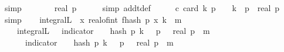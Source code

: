 \begin{isabellebody}
\ simp\isanewline
\ \ \isamarkupfalse%
\ \isamarkupfalse%
\ {\isachardoublequoteopen}{\isachardot}{\kern0pt}{\isachardot}{\kern0pt}{\isachardot}{\kern0pt}\ {\isacharequal}{\kern0pt}\ {\isacharparenleft}{\kern0pt}real\ p{\isacharminus}{\kern0pt}{}{\isacharparenright}{\kern0pt}{\isacharslash}{\kern0pt}{}{\isachardoublequoteclose}\isanewline
\ \ \ \ \isamarkupfalse%
\ {\isacharparenleft}{\kern0pt}simp\ add{\isacharcolon}{\kern0pt}t{\isacharunderscore}{\kern0pt}def{\isacharparenright}{\kern0pt}\isanewline
\ \ \isamarkupfalse%
\ \isamarkupfalse%
\ c{\isacharunderscore}{\kern0pt}{}{\isacharcolon}{\kern0pt}\ {\isachardoublequoteopen}card\ {\isacharparenleft}{\kern0pt}{\isacharbraceleft}{\kern0pt}k{\isachardot}{\kern0pt}\ p\ {\isasymle}\ {}\ {\isacharasterisk}{\kern0pt}\ k{\isacharbraceright}{\kern0pt}\ {\isasyminter}\ {\isacharbraceleft}{\kern0pt}{}{\isachardot}{\kern0pt}{\isachardot}{\kern0pt}{\isacharless}{\kern0pt}p{\isacharbraceright}{\kern0pt}{\isacharparenright}{\kern0pt}\ {\isacharequal}{\kern0pt}\ {\isacharparenleft}{\kern0pt}real\ p{\isacharminus}{\kern0pt}{}{\isacharparenright}{\kern0pt}{\isacharslash}{\kern0pt}{}{\isachardoublequoteclose}\ \isamarkupfalse%
\ simp\isanewline
\isanewline
\ \ \isamarkupfalse%
\ {\isachardoublequoteopen}integral\isactrlsup L\ {\isasymOmega}\ {\isacharparenleft}{\kern0pt}{\isasymlambda}x{\isachardot}{\kern0pt}\ real{\isacharunderscore}{\kern0pt}of{\isacharunderscore}{\kern0pt}int\ {\isacharparenleft}{\kern0pt}f{}{\isacharunderscore}{\kern0pt}hash\ p\ x\ k{\isacharparenright}{\kern0pt}\ {\isacharcircum}{\kern0pt}\ m{\isacharparenright}{\kern0pt}\ {\isacharequal}{\kern0pt}\isanewline
\ \ \ \ integral\isactrlsup L\ {\isasymOmega}\ {\isacharparenleft}{\kern0pt}{\isasymlambda}{\isasymomega}{\isachardot}{\kern0pt}\ indicator\ {\isacharbraceleft}{\kern0pt}{\isasymomega}{\isachardot}{\kern0pt}\ {}\ {\isacharasterisk}{\kern0pt}\ hash\ p\ k\ {\isasymomega}\ {\isacharless}{\kern0pt}\ p{\isacharbraceright}{\kern0pt}\ {\isasymomega}\ {\isacharasterisk}{\kern0pt}\ {\isacharparenleft}{\kern0pt}real\ p\ {\isacharminus}{\kern0pt}\ {}{\isacharparenright}{\kern0pt}{\isacharcircum}{\kern0pt}m\ {\isacharplus}{\kern0pt}\ \isanewline
\ \ \ \ \ \ indicator\ {\isacharbraceleft}{\kern0pt}{\isasymomega}{\isachardot}{\kern0pt}\ {}\ {\isacharasterisk}{\kern0pt}\ hash\ p\ k\ {\isasymomega}\ {\isasymge}\ p{\isacharbraceright}{\kern0pt}\ {\isasymomega}\ {\isacharasterisk}{\kern0pt}\ {\isacharparenleft}{\kern0pt}{\isacharminus}{\kern0pt}real\ p\ {\isacharminus}{\kern0pt}\ {}{\isacharparenright}{\kern0pt}{\isacharcircum}{\kern0pt}m{\isacharparenright}{\kern0pt}{\isachardoublequoteclose}\ \isanewline

\end{isabellebody}
